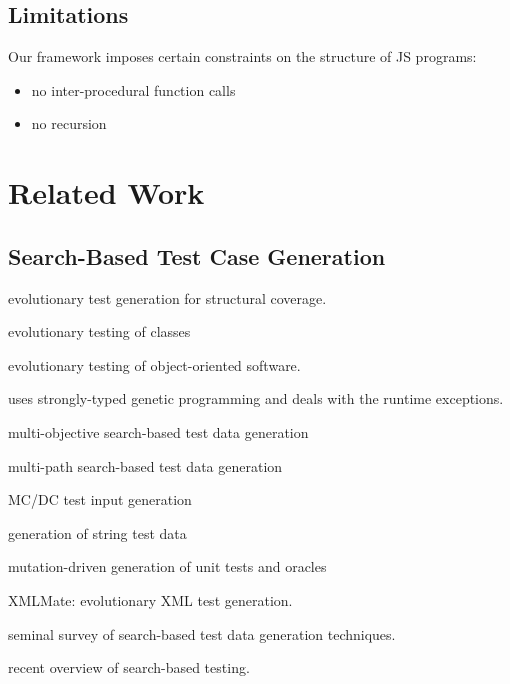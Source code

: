 \documentclass[sigconf]{acmart}
\begin{document}
\subsection{Limitations}
\label{sub.sec.eval.limit}

Our framework imposes certain constraints on the structure of JS programs:
\begin{itemize}
\item no inter-procedural function calls
\item no recursion  
\end{itemize}


\section{Related Work}
\label{sec:related.work}

\subsection{Search-Based Test Case Generation}
\label{sub.sec.search.based}

\cite{wegener2001evolutionary} evolutionary test generation for structural coverage.

\cite{tonella2004evolutionary} evolutionary testing of classes

\cite{wappler2005using} evolutionary testing of object-oriented software.

\cite{wappler2006evolutionary} uses strongly-typed genetic programming and deals with the runtime exceptions.

\cite{lakhotia2007multi} multi-objective search-based test data generation 

\cite{cao2009search} multi-path search-based test data generation

\cite{awedikian2009mc} MC/DC test input generation 

\cite{shahbazi2016black} generation of string test data

\cite{fraser2012mutation} mutation-driven generation of unit tests and oracles

\cite{havrikov2014xmlmate} XMLMate: evolutionary XML test generation.

\cite{mcminn2004search} seminal survey of search-based test data generation techniques.

\cite{mcminn2011search} recent overview of search-based testing.
\end{document}
